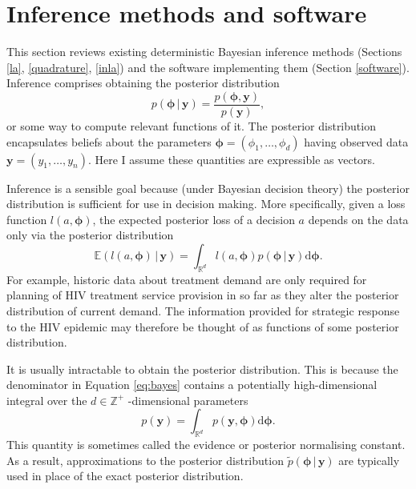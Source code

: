 \documentclass[a4paper, nobind]{templates/ociamthesis}
\begin{document}
\hypertarget{naomi-inference}{%
\section{Inference methods and software}\label{naomi-inference}}

This section reviews existing deterministic Bayesian inference methods (Sections \ref{la}, \ref{quadrature}, \ref{inla}) and the software implementing them (Section \ref{software}).
Inference comprises obtaining the posterior distribution
\begin{equation}
p(\boldsymbol{\mathbf{\phi}} \, | \, \mathbf{y}) = \frac{p(\boldsymbol{\mathbf{\phi}}, \mathbf{y})}{p(\mathbf{y})}, \label{eq:bayes}
\end{equation}
or some way to compute relevant functions of it.
The posterior distribution encapsulates beliefs about the parameters \(\boldsymbol{\mathbf{\phi}} = (\phi_1, \ldots, \phi_d)\) having observed data \(\mathbf{y} = (y_1, \ldots, y_n)\).
Here I assume these quantities are expressible as vectors.

Inference is a sensible goal because (under Bayesian decision theory) the posterior distribution is sufficient for use in decision making.
More specifically, given a loss function \(l(a, \boldsymbol{\mathbf{\phi}})\), the expected posterior loss of a decision \(a\) depends on the data only via the posterior distribution
\begin{equation}
\mathbb{E}(l(a, \boldsymbol{\mathbf{\phi}}) \, | \, \mathbf{y}) = \int_{\mathbb{R}^d} l(a, \boldsymbol{\mathbf{\phi}}) p(\boldsymbol{\mathbf{\phi}} \, | \, \mathbf{y}) \text{d}\boldsymbol{\mathbf{\phi}}.
\end{equation}
For example, historic data about treatment demand are only required for planning of HIV treatment service provision in so far as they alter the posterior distribution of current demand.
The information provided for strategic response to the HIV epidemic may therefore be thought of as functions of some posterior distribution.

It is usually intractable to obtain the posterior distribution.
This is because the denominator in Equation \eqref{eq:bayes} contains a potentially high-dimensional integral over the \(d \in \mathbb{Z}^+\) -dimensional parameters
\begin{equation}
p(\mathbf{y}) = \int_{\mathbb{R}^d} p(\mathbf{y}, \boldsymbol{\mathbf{\phi}}) \text{d}\boldsymbol{\mathbf{\phi}}. \label{eq:evidence}
\end{equation}
This quantity is sometimes called the evidence or posterior normalising constant.
As a result, approximations to the posterior distribution \(\tilde p(\boldsymbol{\mathbf{\phi}} \, | \, \mathbf{y})\) are typically used in place of the exact posterior distribution.
\end{document}
